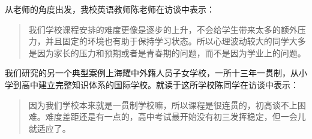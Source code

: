 \documentclass[12pt,UTF8]{ctexart}
\begin{document}
\par {
	从老师的角度出发，我校英语教师陈老师在访谈中表示：
	\begin{quote}
		\kaishu
		我们学校课程安排的难度更像是逐步的上升，不会给学生带来太多的额外压力，并且固定的环境也有助于保持学习状态。所以心理波动较大的同学大多是因为家长的压力和预期或者是青春期的问题，而不是因为学业上的问题。
	\end{quote}
	我们研究的另一个典型案例上海耀中外籍人员子女学校，一所十三年一贯制，从小学到高中建立完整知识体系的国际学校。就读于这所学校陈同学在访谈中表示：
	\begin{quote}
		\kaishu
		因为我们学校本来就是一贯制学校嘛，所以课程是很连贯的，初高谈不上困难。难度差距还是有一点的，高中考试最开始没有初三发挥稳定，但一会儿就适应了。
	\end{quote}
}
\end{document}
